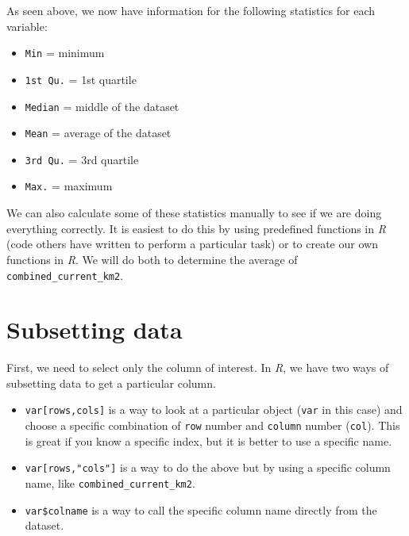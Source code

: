 \documentclass[
  letterpaper,
  DIV=11,
  numbers=noendperiod]{scrreprt}
\newenvironment{Shaded}{\begin{snugshade}}{\end{snugshade}}
\newcommand{\CommentTok}[1]{\textcolor[rgb]{0.37,0.37,0.37}{#1}}
\newcommand{\NormalTok}[1]{\textcolor[rgb]{0.00,0.23,0.31}{#1}}
\newcommand{\SpecialCharTok}[1]{\textcolor[rgb]{0.37,0.37,0.37}{#1}}
\providecommand{\tightlist}{%
  \setlength{\itemsep}{0pt}\setlength{\parskip}{0pt}}\usepackage{longtable,booktabs,array}
\begin{document}
As seen above, we now have information for the following statistics for
each variable:

\begin{itemize}
\tightlist
\item
  \texttt{Min} = minimum
\item
  \texttt{1st\ Qu.} = 1st quartile
\item
  \texttt{Median} = middle of the dataset
\item
  \texttt{Mean} = average of the dataset
\item
  \texttt{3rd\ Qu.} = 3rd quartile
\item
  \texttt{Max.} = maximum
\end{itemize}

We can also calculate some of these statistics manually to see if we are
doing everything correctly. It is easiest to do this by using predefined
functions in \emph{R} (code others have written to perform a particular
task) or to create our own functions in \emph{R}. We will do both to
determine the average of \texttt{combined\_current\_km2}.

\section{Subsetting data}\label{subsetting-data}

First, we need to select only the column of interest. In \emph{R}, we
have two ways of subsetting data to get a particular column.

\begin{itemize}
\tightlist
\item
  \texttt{var{[}rows,cols{]}} is a way to look at a particular object
  (\texttt{var} in this case) and choose a specific combination of
  \texttt{row} number and \texttt{column} number (\texttt{col}). This is
  great if you know a specific index, but it is better to use a specific
  name.
\item
  \texttt{var{[}rows,"cols"{]}} is a way to do the above but by using a
  specific column name, like \texttt{combined\_current\_km2}.
\item
  \texttt{var\$colname} is a way to call the specific column name
  directly from the dataset.
\end{itemize}

\begin{Shaded}
\end{Shaded}
\end{document}
